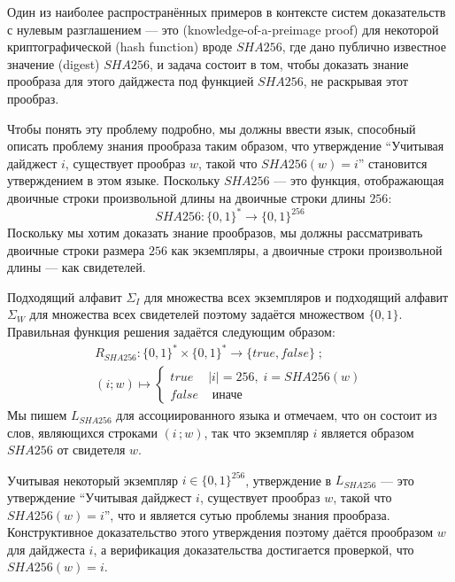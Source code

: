 \begin{example} Один из наиболее распространённых примеров в контексте систем доказательств с нулевым разглашением — это  (knowledge-of-a-preimage proof) для некоторой криптографической  (hash function) вроде $SHA256$, где дано публично известное значение  (digest) $SHA256$, и задача состоит в том, чтобы доказать знание прообраза для этого дайджеста под функцией $SHA256$, не раскрывая этот прообраз.

Чтобы понять эту проблему подробно, мы должны ввести язык, способный описать проблему знания прообраза таким образом, что утверждение ``Учитывая дайджест $i$, существует прообраз $w$, такой что $SHA256(w)=i$'' становится утверждением в этом языке. Поскольку $SHA256$ — это функция, отображающая двоичные строки произвольной длины на двоичные строки длины $256$:
$$
SHA256: \{0,1\}^* \to \{0,1\}^{256}
$$
Поскольку мы хотим доказать знание прообразов, мы должны рассматривать двоичные строки размера $256$ как экземпляры, а двоичные строки произвольной длины — как свидетелей.

Подходящий алфавит $\Sigma_I$ для множества всех экземпляров и подходящий алфавит $\Sigma_W$ для множества всех свидетелей поэтому задаётся множеством $\{0,1\}$. Правильная функция решения задаётся следующим образом:
\begin{multline*}
R_{SHA256} : \{0,1\}^* \times \{0,1\}^* \to \{true, false\}\;;\\
(i;w) \mapsto
\begin{cases}
true & |i|=256,\; i = SHA256(w)\\
false & \text{ иначе}
\end{cases}
\end{multline*}
Мы пишем $L_{SHA256}$ для ассоциированного языка и отмечаем, что он состоит из слов, являющихся строками $(i\,;w)$, так что экземпляр $i$ является образом $SHA256$ от свидетеля $w$.

Учитывая некоторый экземпляр $i\in \{0,1\}^{256}$, утверждение в $L_{SHA256}$ — это утверждение ``Учитывая дайджест $i$, существует прообраз $w$, такой что $SHA256(w)=i$'', что и является сутью проблемы знания прообраза. Конструктивное доказательство этого утверждения поэтому даётся прообразом $w$ для дайджеста $i$, а верификация доказательства достигается проверкой, что $SHA256(w)=i$.
\end{example}
